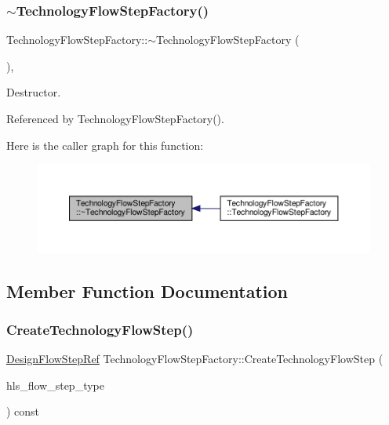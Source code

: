 \subsubsection{\texorpdfstring{$\sim$\+Technology\+Flow\+Step\+Factory()}{~TechnologyFlowStepFactory()}}
{\footnotesize\ttfamily Technology\+Flow\+Step\+Factory\+::$\sim$\+Technology\+Flow\+Step\+Factory (\begin{DoxyParamCaption}{ }\end{DoxyParamCaption})\hspace{0.3cm}{\ttfamily [override]}, {\ttfamily [default]}}



Destructor. 



Referenced by Technology\+Flow\+Step\+Factory().

Here is the caller graph for this function\+:
\nopagebreak
\begin{figure}[H]
\begin{center}
\leavevmode
\includegraphics[width=350pt]{dc/dc9/classTechnologyFlowStepFactory_a5cbc1b73d7e126301a67a631febafedd_icgraph}
\end{center}
\end{figure}


\subsection{Member Function Documentation}
\mbox{\label{classTechnologyFlowStepFactory_a904613e01cfbfeccb66bb9218f3e99a5}} 
\subsubsection{\texorpdfstring{Create\+Technology\+Flow\+Step()}{CreateTechnologyFlowStep()}}
{\footnotesize\ttfamily \hyperlink{design__flow__step_8hpp_a9dd6b4474ddf52d41a78b1aaa12ae6c8}{Design\+Flow\+Step\+Ref} Technology\+Flow\+Step\+Factory\+::\+Create\+Technology\+Flow\+Step (\begin{DoxyParamCaption}\item[{const \hyperlink{technology__flow__step_8hpp_a65208cfec963a7d7def292f9db428292}{Technology\+Flow\+Step\+\_\+\+Type}}]{hls\+\_\+flow\+\_\+step\+\_\+type }\end{DoxyParamCaption}) const}



